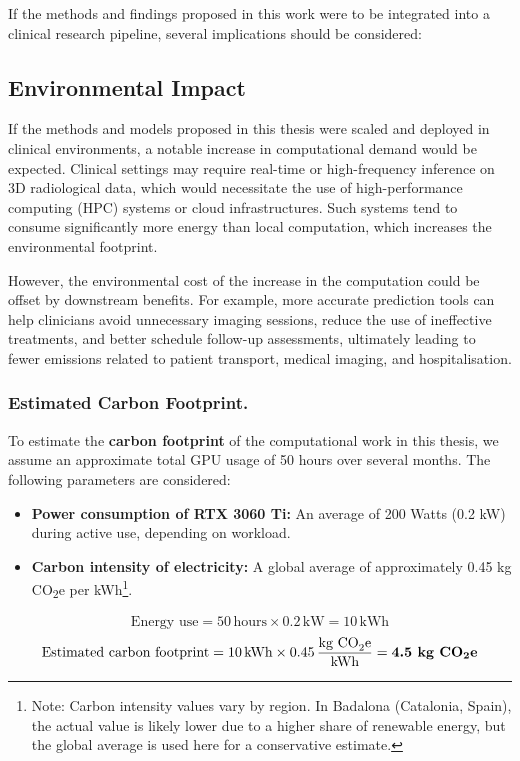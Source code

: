 \documentclass[12pt, a4paper]{report}
\begin{document}
If the methods and findings proposed in this work were to be integrated into a clinical research pipeline, several implications should be considered:

\subsection{Environmental Impact}

If the methods and models proposed in this thesis were scaled and deployed in clinical environments, a notable increase in computational demand would be expected. Clinical settings may require real-time or high-frequency inference on 3D radiological data, which would necessitate the use of high-performance computing (HPC) systems or cloud infrastructures. Such systems tend to consume significantly more energy than local computation, which increases the environmental footprint.

However, the environmental cost of the increase in the computation could be offset by downstream benefits. For example, more accurate prediction tools can help clinicians avoid unnecessary imaging sessions, reduce the use of ineffective treatments, and better schedule follow-up assessments, ultimately leading to fewer emissions related to patient transport, medical imaging, and hospitalisation.

\subsubsection{Estimated Carbon Footprint.} 

To estimate the \textbf{carbon footprint} of the computational work in this thesis, we assume an approximate total GPU usage of 50 hours over several months. The following parameters are considered:

\begin{itemize}
    \item \textbf{Power consumption of RTX 3060 Ti:} An average of 200 Watts (0.2 kW) during active use, depending on workload.
    \item \textbf{Carbon intensity of electricity:} A global average of approximately 0.45 kg CO\textsubscript{2}e per kWh\footnote{Note: Carbon intensity values vary by region. In Badalona (Catalonia, Spain), the actual value is likely lower due to a higher share of renewable energy, but the global average is used here for a conservative estimate.}.
\end{itemize}

\[
\text{Energy use} = 50 \, \text{hours} \times 0.2 \, \text{kW} = 10 \, \text{kWh}
\]
\[
\text{Estimated carbon footprint} = 10 \, \text{kWh} \times 0.45 \, \frac{\text{kg CO}_2\text{e}}{\text{kWh}} = \textbf{4.5 kg CO\textsubscript{2}e}
\]
\end{document}
